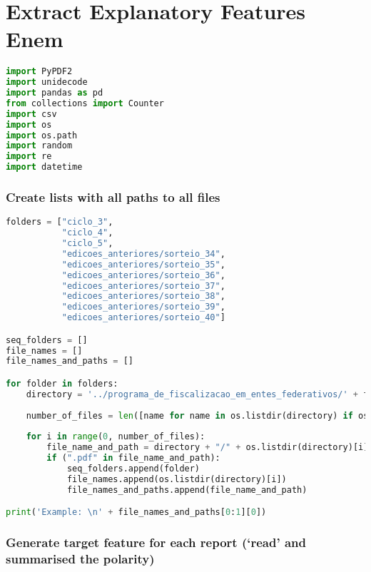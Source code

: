 \section{Extract Explanatory Features Enem}\label{ape:extract_explanatory_features_enem}

\begin{lstlisting}[language=Python]
import PyPDF2
import unidecode
import pandas as pd
from collections import Counter
import csv
import os
import os.path
import random
import re
import datetime
\end{lstlisting}

\subsubsection{Create lists with all paths to all
files}\label{create-lists-with-all-paths-to-all-files}

\begin{lstlisting}[language=Python]
folders = ["ciclo_3",
           "ciclo_4",
           "ciclo_5",
           "edicoes_anteriores/sorteio_34",
           "edicoes_anteriores/sorteio_35",
           "edicoes_anteriores/sorteio_36",
           "edicoes_anteriores/sorteio_37",
           "edicoes_anteriores/sorteio_38",
           "edicoes_anteriores/sorteio_39",
           "edicoes_anteriores/sorteio_40"]

seq_folders = []
file_names = []
file_names_and_paths = []

for folder in folders:
    directory = '../programa_de_fiscalizacao_em_entes_federativos/' + folder
    
    number_of_files = len([name for name in os.listdir(directory) if os.path.isfile(os.path.join(directory, name))])
    
    for i in range(0, number_of_files):
        file_name_and_path = directory + "/" + os.listdir(directory)[i]
        if (".pdf" in file_name_and_path):
            seq_folders.append(folder)
            file_names.append(os.listdir(directory)[i])
            file_names_and_paths.append(file_name_and_path)

print('Example: \n' + file_names_and_paths[0:1][0])
\end{lstlisting}

\subsubsection{\texorpdfstring{Generate target feature for each report
(`read' and summarised the
polarity)}{Generate target feature for each report (read and summarised the polarity)}}\label{generate-target-feature-for-each-report-read-and-summarised-the-polarity}


